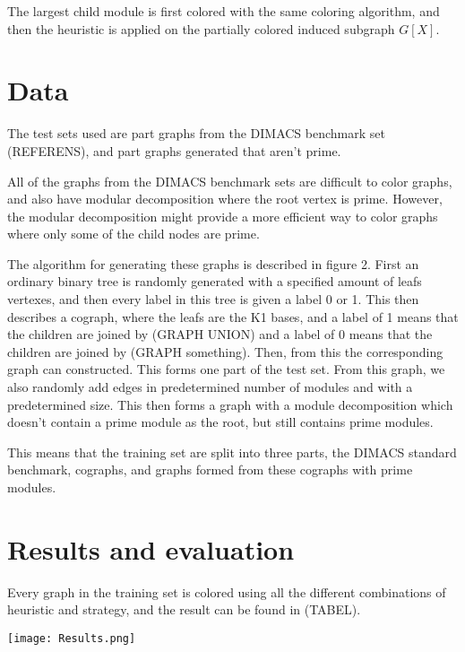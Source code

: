 \documentclass{amsart}
\begin{document}
The largest child module is first colored with the same coloring algorithm, and
then the heuristic is applied on the partially colored induced subgraph 
$G[X]$.


\section{Data}
\label{sec:Data}

The test sets used are part graphs from the DIMACS benchmark set (REFERENS), 
and part graphs generated that aren't prime.

All of the graphs from the DIMACS benchmark sets are difficult to color graphs,
and also have modular decomposition where the root vertex is prime. However, the
modular decomposition might provide a more efficient way to color graphs where
only some of the child nodes are prime. 

The algorithm for generating these graphs is described in figure 2. First an
ordinary binary tree is randomly generated with a specified amount of leafs
vertexes, and then every label in this tree is given a label 0 or 1.  This then
describes a cograph, where the leafs are the K1 bases, and a label of 1 means
that the children are joined by (GRAPH UNION) and a label of 0 means that the
children are joined by (GRAPH something). Then, from this the corresponding
graph can constructed. This forms one part of the test set. From this graph, we
also randomly add edges in predetermined number of modules and with a
predetermined size. This then forms a graph with a module decomposition which
doesn't contain a prime module as the root, but still contains prime modules.

This means that the training set are split into three parts, the DIMACS standard
benchmark, cographs, and graphs formed from these cographs with prime modules.

\section{Results and evaluation}
\label{sec:Result}
Every graph in the training set is colored using all the different combinations
of heuristic and strategy, and the result can be found in (TABEL).

\texttt{[image: Results.png]}

\printbibliography
\end{document}
